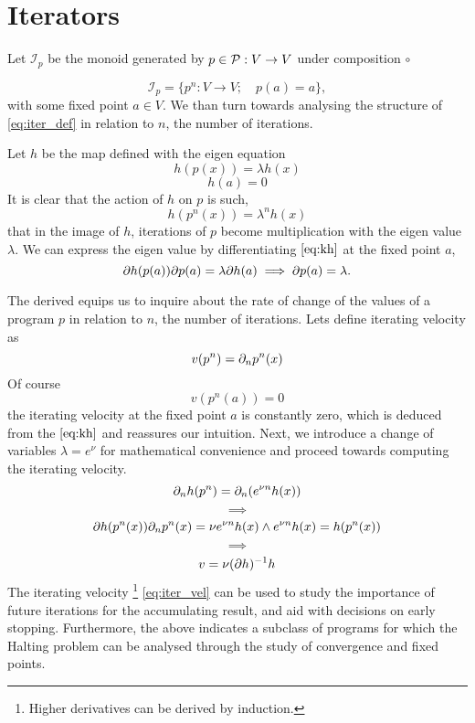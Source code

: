  \section{Iterators}
  
 
Let $\mathcal{I}_p$ be the monoid generated by $p\in\mathcal{P}:V\to V$ under composition $\circ$
  
  \begin{equation}\label{eq:iter_def}
  \mathcal{I}_p=\{p^n:V\to V;\quad p(a)=a\},
  \end{equation}
 with some fixed point $a\in V$. We than turn towards analysing the structure of \eqref{eq:iter_def} in relation to $n$, the number of iterations.

Let $h$ be the map defined with the eigen equation \cite{CompoOper}
  \begin{equation}\label{eq:kh}
  h(p(x))=\lambda h(x)
  \end{equation}
   \begin{equation}
   h(a)=0
   \end{equation}
It is clear that the action of $h$ on $p$ is such, 
  \begin{equation}
  h(p^n(x))=\lambda^nh(x)
  \end{equation}
that in the image of $h$, iterations of $p$ become multiplication with the eigen value $\lambda$. We can express the eigen value by differentiating $\eqref{eq:kh}$ at the fixed point $a$,
$$\partial h(p(a))\partial p(a)=\lambda\partial h(a)\implies\partial p(a)=\lambda.$$

The derived equips us to inquire about the rate of change of the values of a program $p$ in relation to $n$, the number of iterations. Lets define iterating velocity as
  \begin{equation}
  v(p^n)=\partial_np^n(x)
  \end{equation}
Of course
  \begin{equation}
  v(p^n(a))=0
  \end{equation}
the iterating velocity at the fixed point $a$ is constantly zero, which is deduced from the $\eqref{eq:kh}$ and reassures our intuition. Next, we introduce a change of variables $\lambda= e^\nu$ for mathematical convenience and proceed towards computing the iterating velocity.
  $$\partial_nh(p^n)=\partial_n(e^{\nu n}h(x))$$
  $$\implies$$
  $$\partial h(p^n(x))\partial_np^n(x)=\nu e^{\nu n}h(x) \land e^{\nu n}h(x)=h(p^n(x))$$
  $$\implies$$
  \begin{equation}\label{eq:iter_vel}
  v=\nu(\partial h)^{-1}h
  \end{equation}
The iterating velocity
\footnote{Higher derivatives can be derived by induction.}
\eqref{eq:iter_vel} can be used to study the importance of future iterations for the accumulating result, and aid with decisions on early stopping. Furthermore, the above indicates a subclass of programs for which the Halting problem can be analysed through the study of convergence and fixed points.

